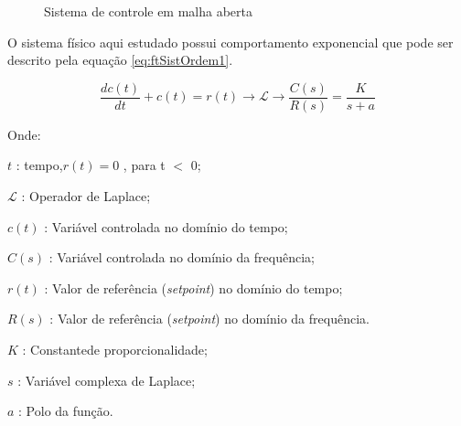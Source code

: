 \begin{figure}[!htb]
\centering
{}
\caption{ Sistema de controle em malha aberta}
\label{fig:AcaoMalhaAberta}
\end{figure}

O sistema físico aqui estudado possui comportamento exponencial que pode ser descrito pela equação \ref{eq:ftSistOrdem1}. 




\begin{equation}
	 \frac{d c(t)}{dt} + c(t) = r(t) \rightarrow  \mathscr{L} \to \frac{C(s)}{R(s)} = \frac{K}{s + a} 
\label{eq:ftSistOrdem1}
\end{equation}


Onde:

\setlength{\parindent}{2cm}

$t$ : tempo,$ r(t) = 0$ , para t $<$ 0;

$\mathscr{L}$ : Operador de Laplace;

$c(t)$ : Variável controlada no domínio do tempo;

$C(s)$ : Variável controlada no domínio da frequência;

$r(t)$ : Valor de referência (\emph{setpoint}) no domínio do tempo;

$R(s)$ : Valor de referência (\emph{setpoint}) no domínio da frequência.

$K$ : Constantede proporcionalidade;

$s$ : Variável complexa de Laplace;

$a$ : Polo da função.
\setlength{\parindent}{1cm}


